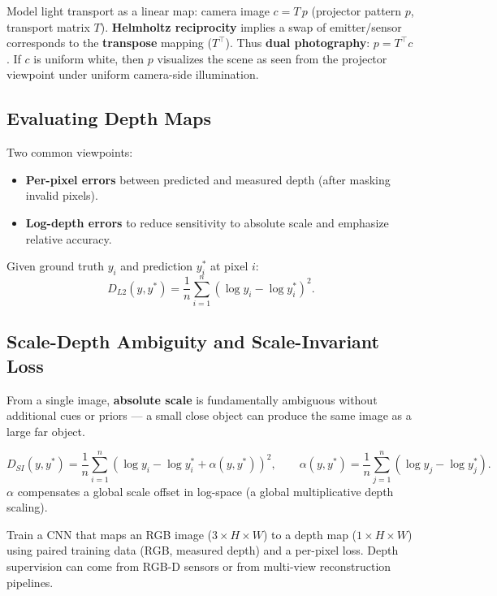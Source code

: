 \documentclass[11pt, oneside]{book}
\begin{document}
Model light transport as a linear map: camera image $c = T\,p$ (projector pattern $p$, transport matrix $T$).
\textbf{Helmholtz reciprocity} implies a swap of emitter/sensor corresponds to the \textbf{transpose} mapping ($T^\top$).
Thus \textbf{dual photography}: $p = T^\top c$.
If $c$ is uniform white, then $p$ visualizes the scene as seen from the projector viewpoint under uniform camera-side illumination.

\subsection{Evaluating Depth Maps}

Two common viewpoints:
\begin{itemize}
  \item \textbf{Per-pixel errors} between predicted and measured depth (after masking invalid pixels).
  \item \textbf{Log-depth errors} to reduce sensitivity to absolute scale and emphasize relative accuracy.
\end{itemize}

\begin{thmbox}[title={Per-Pixel Log-Depth Loss}]
Given ground truth $y_i$ and prediction $y_i^\ast$ at pixel $i$:
\[
D_{L2}(y,y^\ast) = \frac{1}{n}\sum_{i=1}^{n}\left(\log y_i - \log y_i^\ast\right)^2.
\]
\end{thmbox}

\subsection{Scale-Depth Ambiguity and Scale-Invariant Loss}

From a single image, \textbf{absolute scale} is fundamentally ambiguous without additional cues or priors ---
a small close object can produce the same image as a large far object.

\begin{thmbox}[title={Scale-Invariant Loss}]
\[
D_{SI}(y,y^\ast)=\frac{1}{n}\sum_{i=1}^{n}\left(\log y_i - \log y_i^\ast + \alpha(y,y^\ast)\right)^2,
\qquad
\alpha(y,y^\ast)=\frac{1}{n}\sum_{j=1}^{n}\left(\log y_j - \log y_j^\ast\right).
\]
$\alpha$ compensates a global scale offset in log-space (a global multiplicative depth scaling).
\end{thmbox}

\begin{defbox}[title={Monocular Depth Learning}]
Train a CNN that maps an RGB image ($3\times H\times W$) to a depth map ($1\times H\times W$) using paired training data
(RGB, measured depth) and a per-pixel loss.
Depth supervision can come from RGB-D sensors or from multi-view reconstruction pipelines.
\end{defbox}
\end{document}
